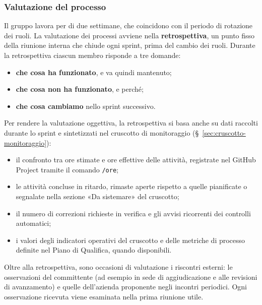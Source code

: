 \documentclass[documento]{gpt}
\begin{document}
	\subsubsection{Valutazione del processo}
	Il gruppo lavora per  di due settimane, che coincidono con il
	periodo di rotazione dei ruoli. La valutazione dei processi avviene nella
	\textbf{retrospettiva}, un punto fisso della riunione interna che chiude
	ogni sprint, prima del cambio dei ruoli. Durante la retrospettiva ciascun
	membro risponde a tre domande:
	\begin{itemize}
		\item \textbf{che cosa ha funzionato}, e va quindi mantenuto;
		\item \textbf{che cosa non ha funzionato}, e perché;
		\item \textbf{che cosa cambiamo} nello sprint successivo.
	\end{itemize}
	
	Per rendere la valutazione oggettiva, la retrospettiva si basa anche su dati
	raccolti durante lo sprint e sintetizzati nel cruscotto di monitoraggio
	(\S~\ref{sec:cruscotto-monitoraggio}):
	\begin{itemize}
		\item il confronto tra ore stimate e ore effettive delle attività,
		registrate nel GitHub Project tramite il comando \texttt{/ore};
		\item le attività concluse in ritardo, rimaste aperte rispetto a quelle
		pianificate o segnalate nella sezione «Da sistemare» del cruscotto;
		\item il numero di correzioni richieste in verifica e gli avvisi ricorrenti
		dei controlli automatici;
		\item i valori degli indicatori operativi del cruscotto e delle metriche di
		processo definite nel Piano di Qualifica, quando disponibili.
	\end{itemize}
	
	Oltre alla retrospettiva, sono occasioni di valutazione i riscontri esterni:
	le osservazioni del committente (ad esempio in sede di aggiudicazione e alle
	revisioni di avanzamento) e quelle dell'azienda proponente negli incontri
	periodici. Ogni osservazione ricevuta viene esaminata nella prima riunione
	utile.
	
\end{document}
